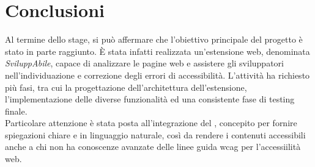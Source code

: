 \chapter{Conclusioni}
\label{chap:conclusioni}
\noindent Al termine dello stage, si può affermare che l’obiettivo principale del progetto è stato in parte raggiunto. È stata infatti realizzata un’estensione web, denominata \textit{SviluppAbile}, capace di analizzare le pagine web e assistere gli sviluppatori nell’individuazione e correzione degli errori di accessibilità. L’attività ha richiesto più fasi, tra cui la progettazione dell’architettura dell’estensione, l’implementazione delle diverse funzionalità ed una consistente fase di testing finale. \\Particolare attenzione è stata posta all’integrazione del , concepito per fornire spiegazioni chiare e in linguaggio naturale, così da rendere i contenuti accessibili anche a chi non ha conoscenze avanzate delle linee guida \acrshort{wcag} per l'accessiilità web.


